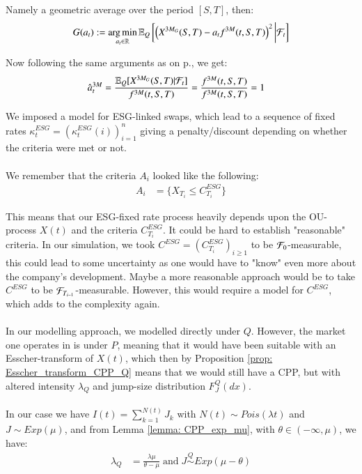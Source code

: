 Namely a geometric average over the period $[S,T]$, then: 
\begin{align*}
G(a_{t}) := \operatorname*{arg\,min}\limits_{a_{t} \in \mathbb{R}}\mathbb{E}_{Q}\left[
\left(
X^{3M_{G}}(S,T)-a_{t}f^{3M}(t,S,T)
\right)^{2}
\bigg{|}\mathcal{F}_{t}
\right]
\end{align*}

Now following the same arguments as on p.\pageref{result: optimal_SOFR_hedge_3MA_vs_3GM}, we get: 
\begin{align*}
\hat{a}_{t}^{3M} &= \frac{
\mathbb{E}_{Q}[X^{3M_{G}}(S,T)|\mathcal{F}_{t}]
}{
f^{3M}(t,S,T)
}
= 
\frac{
f^{3M}(t,S,T)
}{
f^{3M}(t,S,T)
} = 1
\end{align*}


\newpage 
We imposed a model for ESG-linked swaps, which lead to a sequence of fixed rates $\kappa_{t}^{ESG}  = (\kappa_{t}^{ESG}(i))_{i=1}^{n}$ giving a penalty/discount depending on whether the criteria were met or not.
\\~\\ 
We remember that the criteria $A_{i}$ looked like the following:
\begin{align*}
A_{i} &= \{X_{T_{i}} \leq C_{T_{i}}^{ESG}\}    
\end{align*}

This means that our ESG-fixed rate process heavily depends upon the OU-process $X(t)$ and the criteria $C_{T_{i}}^{ESG}$. It could be hard to establish "reasonable" criteria. In our simulation, we took $C^{ESG} = (C_{T_{i}}^{ESG})_{i\geq 1}$ to be $\mathcal{F}_{0}$-measurable, this could lead to some uncertainty as one would have to "know" even more about the company's development. Maybe a more reasonable approach would be to take $C^{ESG}$ to be $\mathcal{F}_{T_{i-1}}$-measurable. However, this would require a model for $C^{ESG}$, which adds to the complexity again.    
\\~\\
In our modelling approach, we modelled directly under $Q$. However, the market one operates in is under $P$, meaning that it would have been suitable with an Esscher-transform of $X(t)$, which then by  Proposition \ref{prop: Esscher_transform_CPP_Q} means that we would still have a CPP, but with altered intensity $\lambda_{Q}$ and jump-size distribution $F_{J}^{Q}(dx)$.
\\~\\
In our case we have $I(t) = \sum_{k=1}^{N(t)}J_{k}$ with $N(t) \sim Pois(\lambda t)$ and 
$J\sim Exp(\mu)$, and from Lemma \ref{lemma: CPP_exp_mu}, with $\theta \in (-\infty, \mu)$, we have:
\begin{align*}
\lambda_{Q} &= \frac{\lambda \mu}{\theta - \mu} \;\text{and}\;
J \stackrel{Q}{\sim} Exp(\mu - \theta)
\end{align*}

